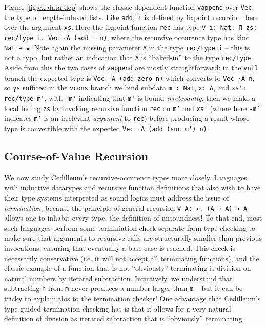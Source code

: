 \documentclass{article}
\begin{document}
Figure \ref{fig:ex-data-dep} shows the classic dependent function
\texttt{vappend} over \texttt{Vec}, the type of length-indexed lists. Like
\texttt{add}, it is defined by fixpoint recursion, here over the argument
\texttt{xs}. Here the fixpoint function \texttt{rec} has type
\texttt{∀ i: Nat. Π zs: rec/type i. Vec ·A (add i n)}, where the recursive
occurence type has kind \texttt{Nat ➔ ★}. Note again the missing parameter
\texttt{A} in the type \texttt{rec/type i} -- this is not a typo, but rather an
indication that \texttt{A} is ``baked-in'' to the type \texttt{rec/type}. Aside
from this the two cases of \texttt{vappend} are mostly straightforward: in the
\texttt{vnil} branch the expected type is \verb;Vec ·A (add zero n); which
converts to \verb;Vec ·A n;, so \texttt{ys} suffices; in the \texttt{vcons}
branch we bind subdata \verb;m': Nat;, \verb;x: A;, and \verb;xs': rec/type m';,
with \verb;-m'; indicating that \verb;m'; is bound \textit{irrelevantly}, then
we make a local biding \texttt{zs} by invoking recursive function \texttt{rec} on
\texttt{m'} and \texttt{xs'} (where here \texttt{-m'} indicates \texttt{m'}
is an irrelevant \textit{argument} to \texttt{rec}) before producing a result
whose type is convertible with the expected \verb;Vec ·A (add (suc m') n);.

\subsection{Course-of-Value Recursion}

We now study Cedilleum's recursive-occurence types more closely. Languages
with inductive datatypes and recursive function definitions that also wish to
have their type systems interpreted as sound logics must address the issue of
\textit{termination}, because the principle of general recursion \texttt{∀ A: ★.
(A ➔ A) ➔ A} allows one to inhabit every type, the definition of unsoundness! To
that end, most such languages perform some terminiation check separate from type
checking to make sure that arguments to recursive calls are
structurally smaller than previous invocations, ensuring that eventually a base case is
reached. This check is necessarily conservative (i.e. it will not accept all
terminating functions), and the classic example of a function that is not
``obviously'' terminating is division on natural numbers by iterated
subtraction. Intuitively, we understand that subtracting \texttt{n} from
\texttt{m} never produces a number larger than \texttt{m} -- but it can be
tricky to explain this to the termination checker! One advantage that
Cedilleum's type-guided termination checking has is that it allows for a very
natural definition of division as iterated subtraction that is ``obviously''
terminating.
\end{document}
